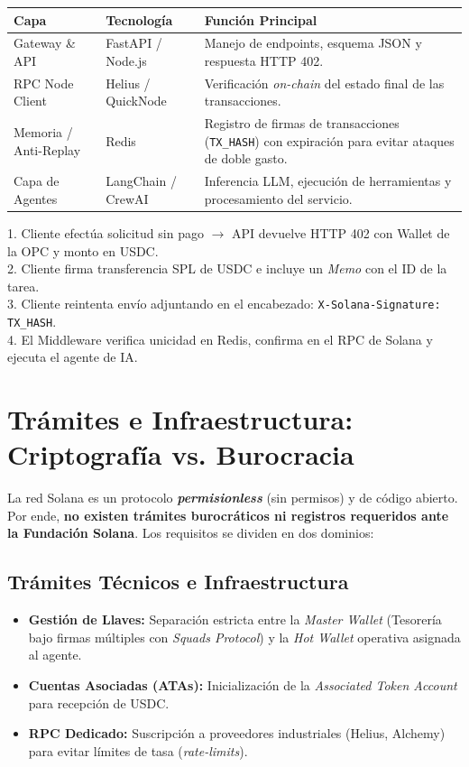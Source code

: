 \documentclass[11pt,a4paper]{article}
\begin{document}
\begin{center}
\small
\begin{tabular}{llp{7cm}}
\toprule
\textbf{Capa} & \textbf{Tecnología} & \textbf{Función Principal} \\
\midrule
Gateway \& API & FastAPI / Node.js & Manejo de endpoints, esquema JSON y respuesta HTTP 402. \\
RPC Node Client & Helius / QuickNode & Verificación \emph{on-chain} del estado final de las transacciones. \\
Memoria / Anti-Replay & Redis & Registro de firmas de transacciones (\texttt{TX\_HASH}) con expiración para evitar ataques de doble gasto. \\
Capa de Agentes & LangChain / CrewAI & Inferencia LLM, ejecución de herramientas y procesamiento del servicio. \\
\bottomrule
\end{tabular}
\end{center}

\begin{tcolorbox}[title=Flujo de Verificación Anti-Replay]
1. Cliente efectúa solicitud sin pago $\rightarrow$ API devuelve HTTP 402 con Wallet de la OPC y monto en USDC.\\
2. Cliente firma transferencia SPL de USDC e incluye un \emph{Memo} con el ID de la tarea.\\
3. Cliente reintenta envío adjuntando en el encabezado: \texttt{X-Solana-Signature: TX\_HASH}.\\
4. El Middleware verifica unicidad en Redis, confirma en el RPC de Solana y ejecuta el agente de IA.
\end{tcolorbox}

\section{Trámites e Infraestructura: Criptografía vs. Burocracia}

La red Solana es un protocolo \textbf{\emph{permisionless}} (sin permisos) y de código abierto. Por ende, \textbf{no existen trámites burocráticos ni registros requeridos ante la Fundación Solana}. Los requisitos se dividen en dos dominios:

\subsection{Trámites Técnicos e Infraestructura}
\begin{itemize}[leftmargin=*]
    \item \textbf{Gestión de Llaves:} Separación estricta entre la \emph{Master Wallet} (Tesorería bajo firmas múltiples con \emph{Squads Protocol}) y la \emph{Hot Wallet} operativa asignada al agente.
    \item \textbf{Cuentas Asociadas (ATAs):} Inicialización de la \emph{Associated Token Account} para recepción de USDC.
    \item \textbf{RPC Dedicado:} Suscripción a proveedores industriales (Helius, Alchemy) para evitar límites de tasa (\emph{rate-limits}).
\end{itemize}
\end{document}
